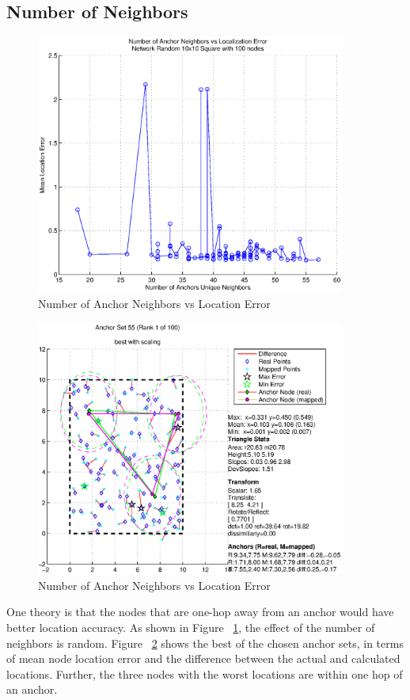 \subsection{Number of Neighbors}
\begin{figure}
  \centering
    \includegraphics[width=4in]{figures/AnchorNeighborsVsError-Random-10x10-Square-with-100-nodes.eps}
    \caption{Number of Anchor Neighbors vs Location Error}
    \label{fig:Neighbors1}
\end{figure}

\begin{figure}
  \centering
    \includegraphics[width=4in]{figures/NetDiff-R2.5-Rank1-AnchorSet55-.eps}
    \caption{Number of Anchor Neighbors vs Location Error}
    \label{fig:Neighbors1Network}
\end{figure}

One theory is that the nodes that are one-hop away from an anchor would have better location accuracy.  As shown in Figure ~\ref{fig:Neighbors1}, the effect of the number of neighbors is random.  Figure ~\ref{fig:Neighbors1Network} shows the best of the chosen anchor sets, in terms of mean node location error and the difference between the actual and calculated locations.  Further, the three nodes with the worst locations are within one hop of an anchor.


